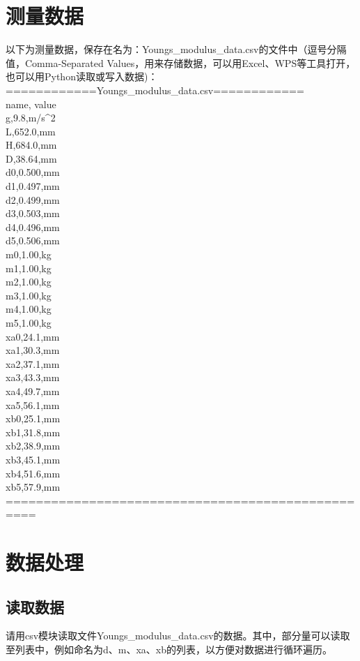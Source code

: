 \section{测量数据}
以下为测量数据，保存在名为：Youngs\_modulus\_data.csv的文件中（逗号分隔值，Comma-Separated Values，用来存储数据，可以用Excel、WPS等工具打开，也可以用Python读取或写入数据)：\\
============Youngs\_modulus\_data.csv============\\
name, value\\
g,9.8,m/s\^{}2\\
L,652.0,mm\\
H,684.0,mm\\
D,38.64,mm\\
d0,0.500,mm\\
d1,0.497,mm\\
d2,0.499,mm\\
d3,0.503,mm\\
d4,0.496,mm\\
d5,0.506,mm\\
m0,1.00,kg\\
m1,1.00,kg\\
m2,1.00,kg\\
m3,1.00,kg\\
m4,1.00,kg\\
m5,1.00,kg\\
xa0,24.1,mm\\
xa1,30.3,mm\\
xa2,37.1,mm\\
xa3,43.3,mm\\
xa4,49.7,mm\\
xa5,56.1,mm\\
xb0,25.1,mm\\
xb1,31.8,mm\\
xb2,38.9,mm\\
xb3,45.1,mm\\
xb4,51.6,mm\\
xb5,57.9,mm\\
==================================================\\

\section{数据处理}

\subsection{读取数据}
请用csv模块读取文件Youngs\_modulus\_data.csv的数据。其中，部分量可以读取至列表中，例如命名为d、m、xa、xb的列表，以方便对数据进行循环遍历。


